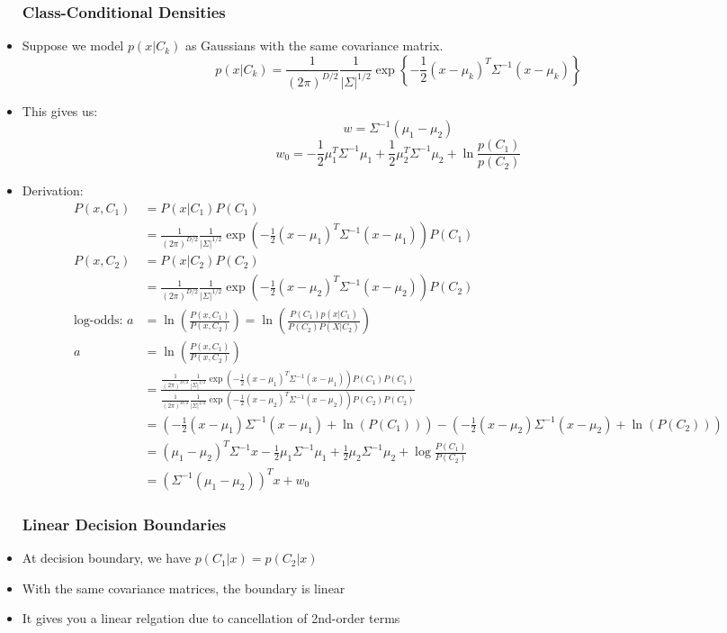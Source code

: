\begin{itemize}
	\subsubsection{Class-Conditional Densities}
	\item Suppose we model $p(x|C_k)$ as Gaussians with the same covariance matrix.
		$$p(x|C_k)=\frac{1}{(2\pi)^{D/2}}\frac{1}{|\Sigma |^{1/2}}\exp\left\{-\frac{1}{2}(x-\mu_k )^T\Sigma^{-1}(x-\mu_k) \right\}$$
	\item This gives us:
		$$w=\Sigma^{-1}(\mu_1 - \mu_2)$$
		$$w_0=-\frac{1}{2}\mu_1^T\Sigma^{-1}\mu_1 +\frac{1}{2}\mu_2^T\Sigma^{-1}\mu_2 + \ln\frac{p(C_1)}{p(C_2)}$$
	\item Derivation:
		$$\begin{aligned}
			P(x, C_1) &= P(x|C_1) P(C_1) \\
				&= \frac{1}{(2\pi)^{D/2}}\frac{1}{|\Sigma|^{1/2}}\exp\left( -\frac{1}{2}(x-\mu_1)^T\Sigma^{-1}(x-\mu_1)\right)P(C_1) \\
			P(x, C_2) &= P(x|C_2) P(C_2) \\
				&= \frac{1}{(2\pi)^{D/2}}\frac{1}{|\Sigma|^{1/2}}\exp\left( -\frac{1}{2}(x-\mu_2)^T\Sigma^{-1}(x-\mu_2)\right)P(C_2) \\
			\text{log-odds: }a &= \ln(\frac{P(x, C_1)}{P(x, C_2)})=\ln(\frac{P(C_1)p(x|C_1)}{P(C_2)P(X|C_2)}) \\
			a &= \ln(\frac{P(x, C_1)}{P(x, C_2)}) \\
			&= \frac{\frac{1}{(2\pi)^{D/2}}\frac{1}{|\Sigma|^{1/2}}\exp\left( -\frac{1}{2}(x-\mu_1)^T\Sigma^{-1}(x-\mu_1)\right)P(C_1)P(C_1)}{\frac{1}{(2\pi)^{D/2}}\frac{1}{|\Sigma|^{1/2}}\exp\left( -\frac{1}{2}(x-\mu_2)^T\Sigma^{-1}(x-\mu_2)\right)P(C_2)P(C_2)} \\
			&= (-\frac{1}{2}(x-\mu_1)\Sigma^{-1}(x-\mu_1) + \ln(P(C_1))) - (-\frac{1}{2}(x-\mu_2)\Sigma^{-1}(x-\mu_2) + \ln(P(C_2))) \\
			&= (\mu_1 - \mu_2)^T\Sigma^{-1}x-\frac{1}{2}\mu_1\Sigma^{-1}\mu_1+\frac{1}{2}\mu_2\Sigma^{-1}\mu_2 + \log\frac{P(C_1)}{P(C_2)}\\
			&= (\Sigma^{-1}(\mu_1 - \mu_2))^T x + w_0
		\end{aligned}$$
		\subsubsection{Linear Decision Boundaries}
		\item At decision boundary, we have $p(C_1|x)=p(C_2|x)$
		\item With the same covariance matrices, the boundary is linear
		\item It gives you a linear relgation due to cancellation of 2nd-order terms

\end{itemize}
